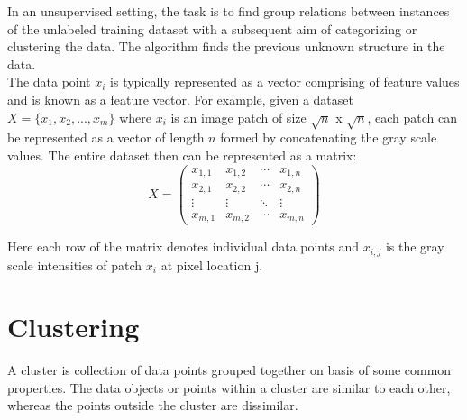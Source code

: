 In an unsupervised setting, the task is to find group relations between instances of the unlabeled training dataset with a subsequent aim of categorizing or clustering the data. The algorithm finds the previous unknown structure in the data.\\

The data point $x_i$ is typically represented as a vector comprising of feature values and is known as a feature vector. For example, given a dataset $X =\{x_1,x_2,...,x_m\}$ where $x_i$ is an image patch of size $\sqrt{n}$ x $\sqrt{n}$, each patch can be represented as a vector of length $n$ formed by concatenating the gray scale values. The entire dataset then can be represented as a matrix:
\begin{equation*}
X = \begin{pmatrix}
x_{1,1} & x_{1,2} & \cdots & x_{1,n} \\
x_{2,1} & x_{2,2} & \cdots & x_{2,n} \\
\vdots  & \vdots  & \ddots & \vdots  \\
x_{m,1} & x_{m,2} & \cdots & x_{m,n}
\end{pmatrix}
\end{equation*}

Here each row of the matrix denotes individual data points and ${x_{i,j}}$ is the gray scale intensities of patch $x_i$ at pixel location j.
%
%
%
%
%

\section{Clustering}
A cluster is collection of data points grouped together on basis of some common properties. The data objects or points within a cluster are similar to each other, whereas the points outside the cluster are dissimilar.\\

